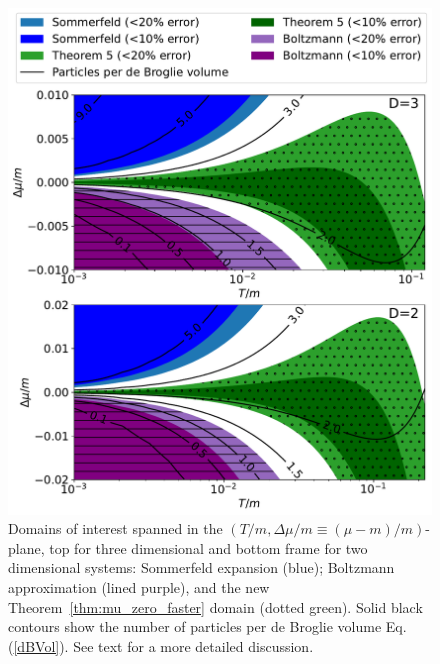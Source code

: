 \documentclass[sn-mathphys,Numbered]{sn-jnl}
\newcommand{\req}[1]{Eq.\,(\ref{#1})}
\newcommand{\rTh}[1]{Theorem~{\ref{#1}}}
\begin{document}
\begin{figure}  %
\centering
 \includegraphics[width=.75\textwidth]{plot/Sommerfeld_vs_ours_vs_Boltzmann_regions_1_term.pdf}
\caption{Domains of interest spanned in the $(T/m,\Delta\mu/m\equiv(\mu-m)/m)$-plane, top for three dimensional and bottom frame for two dimensional systems: Sommerfeld expansion (blue); Boltzmann approximation (lined purple), and the new  \rTh{thm:mu_zero_faster} domain (dotted green). Solid black contours show the number of particles per de Broglie volume \req{dBVol}. See text for a more detailed discussion.}\label{fig:Thm3_vs_Sommerfeld_regions}
\end{figure}
\end{document}
